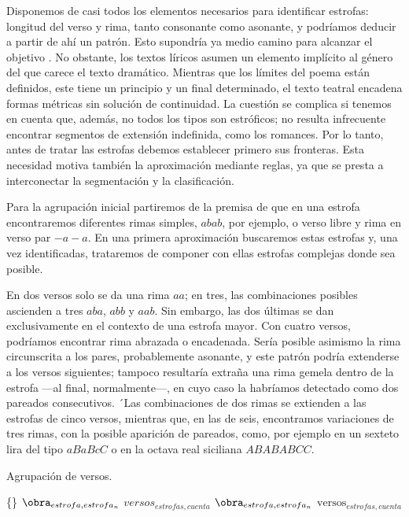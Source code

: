 Disponemos de casi todos los elementos necesarios para identificar estrofas: longitud del verso y rima, tanto consonante como asonante, y podríamos deducir a partir de ahí un patrón. Esto supondría ya medio camino para alcanzar el objetivo \parencite{perez2021}. No obstante, los textos líricos asumen un elemento implícito al género del que carece el texto dramático. Mientras que los límites del poema están definidos, este tiene un principio y un final determinado, el texto teatral encadena formas métricas sin solución de continuidad. La cuestión se complica si tenemos en cuenta que, además, no todos los tipos son estróficos; no resulta infrecuente encontrar segmentos de extensión indefinida, como los romances. Por lo tanto, antes de tratar las estrofas debemos establecer primero sus fronteras. Esta necesidad motiva también la aproximación mediante reglas, ya que se presta a interconectar la segmentación y la clasificación.

Para la agrupación inicial partiremos de la premisa de que en una estrofa encontraremos diferentes rimas simples, $abab$, por ejemplo, o verso libre y rima en verso par $-a-a$. En una primera aproximación buscaremos estas estrofas y, una vez identificadas, trataremos de componer con ellas estrofas complejas donde sea posible.

En dos versos solo se da una rima $aa$; en tres, las combinaciones posibles ascienden a tres $aba$, $abb$ y $aab$. Sin embargo, las dos últimas se dan exclusivamente en el contexto de una estrofa mayor. Con cuatro versos, podríamos encontrar rima abrazada o encadenada. Sería posible asimismo la rima circunscrita a los pares, probablemente asonante, y este patrón podría extenderse a los versos siguientes; tampoco resultaría extraña una rima gemela dentro de la estrofa —al final, normalmente—, en cuyo caso la habríamos detectado como dos pareados consecutivos. ´Las combinaciones de dos rimas se extienden a las estrofas de cinco versos, mientras que, en las de seis, encontramos variaciones de tres rimas, con la posible aparición de pareados, como, por ejemplo en un sexteto lira del tipo $aBaBcC$ o en la octava real siciliana $ABABABCC$.

\begin{algorithm}[!ht]
	\caption{Agrupación de versos.}\label{list:stanzas1}
	\versos \gets \{\} \;
	$\obra_{estrofa, estrofa_n}$ \gets $versos_{estrofas, cuenta}$ \;
	$\obra_{estrofa, estrofa_n}$ \gets $\text{versos}_{estrofas, cuenta}$ \;
\end{algorithm}

